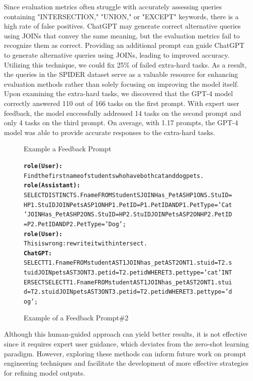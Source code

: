 Since evaluation metrics often struggle with accurately assessing queries containing "INTERSECTION," "UNION," or "EXCEPT" keywords, there is a high rate of false positives. ChatGPT may generate correct alternative queries using JOINs that convey the same meaning, but the evaluation metrics fail to recognize them as correct. Providing an additional prompt can guide ChatGPT to generate alternative queries using JOINs, leading to improved accuracy. Utilizing this technique, we could fix 25\% of failed extra-hard tasks. As a result, the queries in the SPIDER dataset serve as a valuable resource for enhancing evaluation methods rather than solely focusing on improving the model itself.
Upon examining the extra-hard tasks, we discovered that the GPT-4 model correctly answered 110 out of 166 tasks on the first prompt. With expert user feedback, the model successfully addressed 14 tasks on the second prompt and only 4 tasks on the third prompt. On average, with 1.17 prompts, the GPT-4 model was able to provide accurate responses to the extra-hard tasks.

\begin{figure}[H]
    \begin{AIbox}{Example a Feedback Prompt}
        \vspace{-10px}
        \parbox{1\textwidth}{\scriptsize
        \begin{alltt} 
            {\bf role(User):} \\
            Find the first name of students who have both cat and dog pets.
            \\
            {\bf role(Assistant):} \\
            SELECT DISTINCT S.Fname FROM Student S JOIN Has\_Pet AS HP1 ON S.StuID = HP1.StuID JOIN Pets AS P1 ON HP1.PetID = P1.PetID AND P1.PetType = 'Cat' JOIN Has\_Pet AS HP2 ON S.StuID = HP2.StuID JOIN Pets AS P2 ON HP2.PetID = P2.PetID AND P2.PetType = 'Dog';
            \\
            {\bf role(User):} \\
            This is wrong: rewrite it with intersect.
            \\
            {\bf ChatGPT:} \\
            SELECT T1.Fname FROM student AS T1 JOIN has\_pet AS T2 ON T1.stuid  =  T2.stuid JOIN pets AS T3 ON T3.petid  =  T2.petid WHERE T3.pettype  =  'cat' INTERSECT SELECT T1.Fname FROM student AS T1 JOIN has\_pet AS T2 ON T1.stuid  =  T2.stuid JOIN pets AS T3 ON T3.petid  =  T2.petid WHERE T3.pettype  =  'dog';
        \end{alltt}
        }
        \vspace{-10px}
    \end{AIbox}
    
    \caption{Example of a Feedback Prompt\#2}
\end{figure}

Although this human-guided approach can yield better results, it is not effective since it requires expert user guidance, which deviates from the zero-shot learning paradigm. However, exploring these methods can inform future work on prompt engineering techniques and facilitate the development of more effective strategies for refining model outputs.